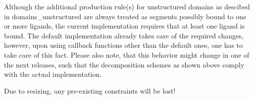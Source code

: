 
\begin{DoxyRefList}
\item[\label{bug__bug000002}%
\Hypertarget{bug__bug000002}%
Module \hyperlink{group__domains__up}{domains\+\_\+up} ]Although the additional production rule(s) for unstructured domains as descibed in domains\+\_\+unstructured are always treated as \textquotesingle{}segments possibly bound to one or more ligands\textquotesingle{}, the current implementation requires that at least one ligand is bound. The default implementation already takes care of the required changes, however, upon using callback functions other than the default ones, one has to take care of this fact. Please also note, that this behavior might change in one of the next releases, such that the decomposition schemes as shown above comply with the actual implementation. 
\item[\label{bug__bug000001}%
\Hypertarget{bug__bug000001}%
Global \hyperlink{group__subopt__zuker_gababde9d210eb433854f1e71da7815fbb}{vrna\+\_\+subopt\+\_\+zuker} (vrna\+\_\+fold\+\_\+compound\+\_\+t $\ast$vc)]Due to resizing, any pre-\/existing constraints will be lost!
\end{DoxyRefList}